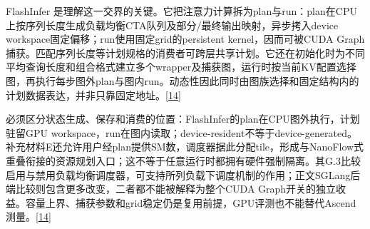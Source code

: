 \documentclass[
  UTF8,
  zihao=5]{ctexart}
\begin{document}
FlashInfer
是理解这一交界的关键。它把注意力计算拆为plan与run：plan在CPU上按序列长度生成负载均衡CTA队列及部分/最终输出映射，异步拷入device
workspace固定偏移；run使用固定grid的persistent kernel，因而可被CUDA
Graph捕获。匹配序列长度等计划规格的消费者可跨层共享计划。它还在初始化时为不同平均查询长度和组合格式建立多个wrapper及捕获图，运行时按当前KV配置选择图，再执行每步图外plan与图内run。动态性因此同时由图族选择和固定结构内的计划数据表达，并非只靠固定地址。{[}\protect\hyperlink{ref-ye2025flashinfer}{14}{]}

必须区分状态生成、保存和消费的位置：FlashInfer的plan在CPU图外执行，计划驻留GPU
workspace，run在图内读取；device-resident不等于device-generated。补充材料E还允许用户经plan提供SM数，调度器据此分配tile，形成与NanoFlow式重叠衔接的资源规划入口；这不等于任意运行时都拥有硬件强制隔离。其G.3比较启用与禁用负载均衡调度器，可支持所列负载下调度机制的作用；正文SGLang后端比较则包含更多改变，二者都不能被解释为整个CUDA
Graph开关的独立收益。容量上界、捕获参数和grid稳定仍是复用前提，GPU评测也不能替代Ascend测量。{[}\protect\hyperlink{ref-ye2025flashinfer}{14}{]}
\end{document}
